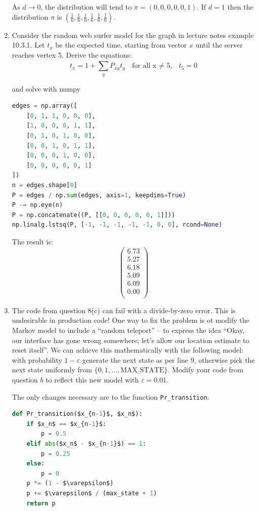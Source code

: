 \documentclass[10pt,\jkfside,a4paper]{article}
\begin{document}
\begin{enumerate}
As $d \to 0$, the distribution will tend to $\pi = (0, 0, 0, 0, 0, 1)$. If
$d = 1$ then the distribution $\pi$ is $\left( \frac{1}{6}, \frac{1}{6},
\frac{1}{6}, \frac{1}{6}, \frac{1}{6}, \frac{1}{6} \right)$.

\item Consider the random web surfer model for the graph in lecture notes
example 10.3.1. Let $t_x$ be the expected time, starting from vector $x$
until the server reaches vertex 5. Derive the equations:
\[
t_x = 1 + \sum^{}_{y} P_{xy}t_y \ \ \ \text{for all x $\neq$ 5,} \ \ \ t_5
= 0
\]

and solve with numpy

\begin{lstlisting}[language=Python]
edges = np.array([
    [0, 1, 1, 0, 0, 0],
    [1, 0, 0, 0, 1, 1],
    [0, 1, 0, 1, 0, 0],
    [0, 0, 1, 0, 1, 1],
    [0, 0, 0, 1, 0, 0],
    [0, 0, 0, 0, 0, 1]
])
n = edges.shape[0]
P = edges / np.sum(edges, axis=1, keepdims=True)
P -= np.eye(n)
P = np.concatenate((P, [[0, 0, 0, 0, 0, 1]]))
np.linalg.lstsq(P, [-1, -1, -1, -1, -1, 0, 0], rcond=None)
\end{lstlisting}

The result is:
\[
\begin{pmatrix}
6.73 \\
5.27 \\
6.18 \\
5.09 \\
6.09 \\
0.00 \\
\end{pmatrix}
\]

\item The code from question 8(c) can fail with a divide-by-zero error.
This is undesirable in production code! One way to fix the problem is ot
modify the Markov model to include a ``random teleport'' -- to express the
idea ``Okay, our interface has gone wrong somewhere; let's allow our
location estimate to reset itself''. We can achieve this mathematically with
the following model: with probability $1 - \varepsilon$ generate the next
state as per line 9, otherwise pick the next state uniformly from $\{0, 1,
\dots, \text{MAX\_STATE}\}$. Modify your code from question $b$ to reflect
this new model with $\varepsilon = 0.01$.

The only changes necessary are to the function \texttt{Pr\_transition}:

\begin{lstlisting}[language=Python, mathescape=true]
def Pr_transition($x_{n-1}$, $x_n$):
	if $x_n$ == $x_{n-1}$:
		p = 0.5
	elif abs($x_n$ - $x_{n-1}$) == 1:
		p = 0.25
	else:
		p = 0
	p *= (1 - $\varepsilon$)
	p += $\varepsilon$ / (max_state + 1)
	return p
\end{lstlisting}


\end{enumerate}
\end{document}
